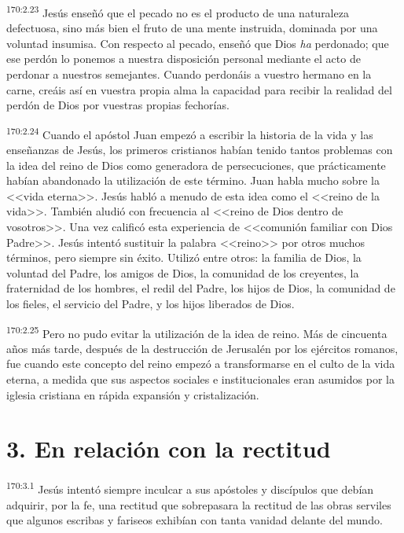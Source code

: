 \par 
\textsuperscript{170:2.23} Jesús enseñó que el pecado no es el producto de una naturaleza defectuosa, sino más bien el fruto de una mente instruida, dominada por una voluntad insumisa. Con respecto al pecado, enseñó que Dios \textit{ha} perdonado; que ese perdón lo ponemos a nuestra disposición personal mediante el acto de perdonar a nuestros semejantes. Cuando perdonáis a vuestro hermano en la carne, creáis así en vuestra propia alma la capacidad para recibir la realidad del perdón de Dios por vuestras propias fechorías.

\par 
\textsuperscript{170:2.24} Cuando el apóstol Juan empezó a escribir la historia de la vida y las enseñanzas de Jesús, los primeros cristianos habían tenido tantos problemas con la idea del reino de Dios como generadora de persecuciones, que prácticamente habían abandonado la utilización de este término. Juan habla mucho sobre la <<vida eterna>>. Jesús habló a menudo de esta idea como el <<reino de la vida>>. También aludió con frecuencia al <<reino de Dios dentro de vosotros>>. Una vez calificó esta experiencia de <<comunión familiar con Dios Padre>>. Jesús intentó sustituir la palabra <<reino>> por otros muchos términos, pero siempre sin éxito. Utilizó entre otros: la familia de Dios, la voluntad del Padre, los amigos de Dios, la comunidad de los creyentes, la fraternidad de los hombres, el redil del Padre, los hijos de Dios, la comunidad de los fieles, el servicio del Padre, y los hijos liberados de Dios.

\par 
\textsuperscript{170:2.25} Pero no pudo evitar la utilización de la idea de reino. Más de cincuenta años más tarde, después de la destrucción de Jerusalén por los ejércitos romanos, fue cuando este concepto del reino empezó a transformarse en el culto de la vida eterna, a medida que sus aspectos sociales e institucionales eran asumidos por la iglesia cristiana en rápida expansión y cristalización.

\section*{3. En relación con la rectitud}
\par 
\textsuperscript{170:3.1} Jesús intentó siempre inculcar a sus apóstoles y discípulos que debían adquirir, por la fe, una rectitud que sobrepasara la rectitud de las obras serviles que algunos escribas y fariseos exhibían con tanta vanidad delante del mundo.

